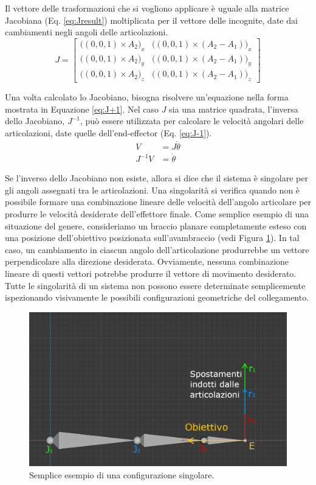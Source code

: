 Il vettore delle trasformazioni che si vogliono applicare è uguale alla matrice Jacobiana (Eq. \ref{eq:Jresult}) moltiplicata per il vettore delle incognite, date dai cambiamenti negli angoli delle articolazioni.
\begin{equation}\label{eq:Jresult}
    J=
    \begin{bmatrix}
        \big((0,0,1) \times A_2\big)_x & \big((0,0,1) \times (A_2-A_1)\big)_x\\
        \big((0,0,1) \times A_2\big)_y & \big((0,0,1) \times (A_2-A_1)\big)_y\\
        \big((0,0,1) \times A_2\big)_z & \big((0,0,1) \times (A_2-A_1)\big)_z
    \end{bmatrix}
\end{equation}

Una volta calcolato lo Jacobiano, bisogna risolvere un'equazione nella forma mostrata in Equazione \ref{eq:J+1}. Nel caso $J$ sia una matrice quadrata, l'inversa dello Jacobiano, $J^{-1}$, può essere utilizzata per calcolare le velocità angolari delle articolazioni, date quelle dell'end-effector (Eq. \ref{eq:J-1}).
\begin{align}
    \label{eq:J+1}
    V &= J\dot{\theta}\\
    \label{eq:J-1}
    J^{-1}V &= \dot{\theta}
\end{align}

Se l'inverso dello Jacobiano non esiste, allora si dice che il sistema è singolare per gli angoli  assegnati tra le articolazioni.
Una singolarità si verifica quando non è possibile formare una combinazione lineare delle velocità dell'angolo articolare per produrre le velocità desiderate dell'effettore finale.
Come semplice esempio di una situazione del genere, consideriamo un braccio planare completamente esteso con una posizione dell'obiettivo posizionata sull'avambraccio (vedi Figura \ref{fig:singol}).
In tal caso, un cambiamento in ciascun angolo dell’articolazione produrrebbe un vettore perpendicolare alla direzione desiderata. Ovviamente, nessuna combinazione lineare di questi vettori potrebbe produrre il vettore di movimento desiderato. Tutte le singolarità di un sistema non possono essere determinate semplicemente ispezionando visivamente le possibili configurazioni geometriche del collegamento.
\begin{figure}
\centering
\includegraphics[width=.8\textwidth]{Figures/planarextendedarm}
\decoRule
\caption[Configurazione singolare]{Semplice esempio di una configurazione singolare.}
\label{fig:singol}
\end{figure}

